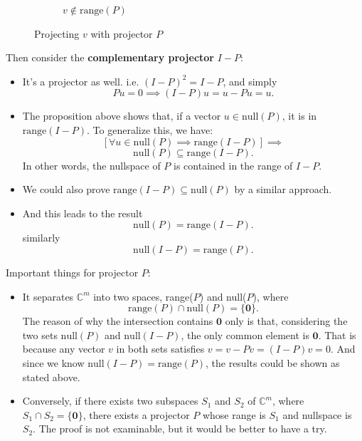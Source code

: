 \begin{itemize}
\begin{figure}[H]
\begin{subfigure}[b]{0.5\textwidth}
      \caption{$v \notin \text{range}(P)$}
      \label{outrange}
    \end{subfigure}
    \caption{Projecting $v$ with projector $P$}
  \end{figure}
\end{itemize}
Then consider the \textbf{complementary projector} $I - P$:
\begin{itemize}
  \item It's a projector as well. i.e. $(I - P)^2 = I - P$, and simply
    \[
      Pu = 0 \implies (I - P)u = u - Pu = u
    .\]
  \item The proposition above shows that, if a vector $u \in \text{null}(P)$, it is in $\text{range}(I - P)$. To generalize this, we have:
    \[
      [\forall u \in \text{null}(P) \implies \text{range}(I - P)] \implies
    \]
    \[
      \text{null}(P) \subseteq \text{range}(I - P)
    .\] 
    In other words, the nullspace of $P$ is contained in the range of $I - P$.
  \item We could also prove
    \(
      \text{range}(I - P) \subseteq \text{null}(P)
    \) by a similar approach.
    \item And this leads to the result
      \[
        \text{null}(P) = \text{range}(I - P)
      .\]
      similarly
      \[
        \text{null}(I - P) = \text{range}(P)
      .\] 
\end{itemize}
Important things for projector $P$: 
\begin{itemize}
\item  It separates $\mathbb{C}^{m}$ into two spaces, range($P$) and null($P$), where 
  \[
  \text{range}(P) \cap \text{null}(P) = \{\textbf{0}\}
  .\] 
  The reason of why the intersection contains $\textbf{0}$ only is that, considering the two sets $\text{null}(P)$ and $\text{null}(I - P)$, the only common element is $\textbf{0}$. That is because any vector $v$ in both sets satisfies $v = v - Pv = (I - P)v = 0$. And since we know $\text{null}(I - P) = \text{range}(P)$, the results could be shown as stated above. \checked

\item Conversely, if there exists two subspaces $S_1$ and $S_2$ of $\mathbb{C}^{m}$, where $S_1 \cap S_2 = \{\textbf{0}\}$, there exists a projector $P$ whose range is $S_1$ and nullspace is $S_2$. The proof is not examinable, but it would be better to have a try.
\end{itemize}
